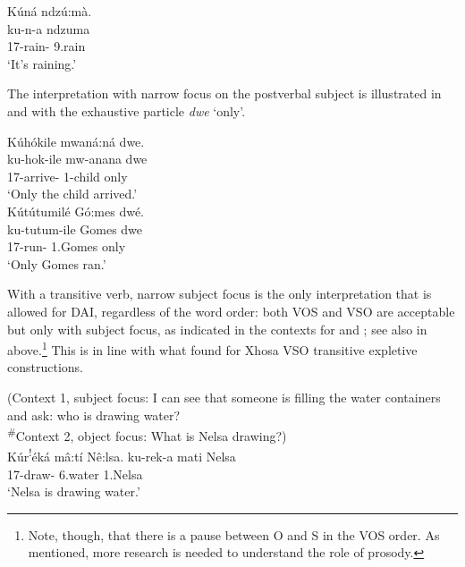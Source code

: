 \documentclass[output=paper]{langscibook}
\begin{document}
\ex
\label{bkm:Ref121990820}\label{bkm:Ref127259301}
Kúná ndzú:mà.\\
\gll
ku-n-a  ndzuma\\
17\SM{}-rain-\FV{}  9.rain\\
\glt
‘It's raining.’

\z

The interpretation with narrow focus on the postverbal subject is illustrated in  and  with the exhaustive particle \textit{dwe} ‘only’.\largerpage

\ea
\label{bkm:Ref121990826}
Kúhókile mwaná:ná dwe.\\
\gll
ku-hok-ile  mw-anana  dwe\\
17\SM{}-arrive-\PFV{}  1-child  only\\
\glt
‘Only the child arrived.’\\

\ex
\label{bkm:Ref121990832}
Kútútumilé Gó:mes dwé.\\
\gll
ku-tutum-ile  Gomes  dwe\\
17\SM{}-run-\PFV{}  1.Gomes  only\\
\glt
‘Only Gomes ran.’\\

\z

With a transitive verb, narrow subject focus is the only interpretation that is allowed for DAI, regardless of the word order: both VOS and VSO are acceptable but only with subject focus, as indicated in the contexts for  and ; see also in  above.\footnote{Note, though, that there is a pause between O and S in the VOS order. As mentioned, more research is needed to understand the role of prosody.} This is in line with what \citet{CarstensMletshe2015} found for Xhosa VSO transitive expletive constructions.

\ea
\label{bkm:Ref136287722}
(Context 1, subject focus: I can see that someone is filling the water containers and ask: who is drawing water? \\
\textsuperscript{\#}Context 2, object focus: What is Nelsa drawing?)\\
Kúr\textsuperscript{!}éká mâ:tí Nê:lsa.    \jambox*{[VOS]}
\gll
ku-rek-a   mati  Nelsa\\
17\SM{}-draw-\FV{}  6.water  1.Nelsa\\
\glt
‘Nelsa is drawing water.’
\end{document}
